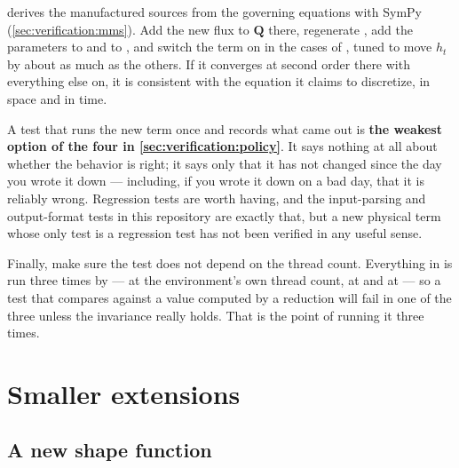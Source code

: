 \begin{tip}
   derives the manufactured sources from the
  governing equations with SymPy (\cref{sec:verification:mms}). Add the new
  flux to $\mathbf{Q}$ there, regenerate ,
  add the parameters to  and to
  , and switch the term on in the
   cases of , tuned to move $h_t$ by about
  as much as the others. If it converges at second order there with
  everything else on, it is consistent with the equation it claims to
  discretize, in space and in time.
\end{tip}

\begin{warn}
  A test that runs the new term once and records what came out is
  \textbf{the weakest option of the four in \cref{sec:verification:policy}}. It
  says nothing at all about whether the behavior is right; it says only that
  it has not changed since the day you wrote it down --- including, if you
  wrote it down on a bad day, that it is reliably wrong. Regression tests are
  worth having, and the input-parsing and output-format tests in this
  repository are exactly that, but a new physical term whose only test is a
  regression test has not been verified in any useful sense.
\end{warn}

Finally, make sure the test does not depend on the thread count. Everything in
 is run three times by  --- at the environment's
own thread count, at  and at
 --- so a test that compares against a value computed
by a reduction will fail in one of the three unless the invariance really
holds. That is the point of running it three times.

\section{Smaller extensions}
\label{sec:extending:other}

\subsection{A new shape function}

